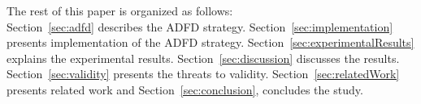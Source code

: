 \documentclass[runningheads,a4paper]{llncs}
\begin{document}





The rest of this paper is organized as follows: \\ Section~\ref{sec:adfd} describes the ADFD strategy. Section~\ref{sec:implementation} presents implementation of the ADFD strategy. Section~\ref{sec:experimentalResults} explains the experimental results. Section~\ref{sec:discussion} discusses the results. Section~\ref{sec:validity} presents the threats to validity. Section~\ref{sec:relatedWork} presents related work and Section~\ref{sec:conclusion}, concludes the study.
\end{document}
